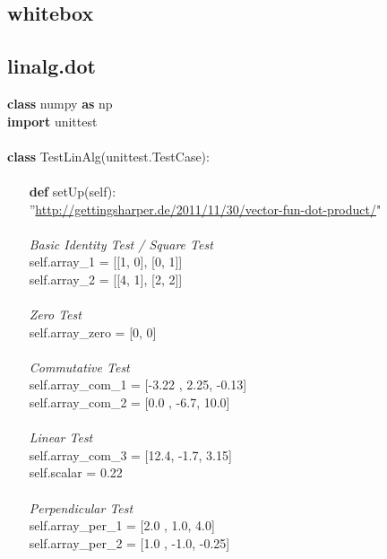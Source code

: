\documentclass[a4paper,11pt]{article}
\begin{document}
\subsection{whitebox}




\subsection{linalg.dot}
\begin{algorithm}[H]
	\textbf{class} numpy \textbf{as} np
\\	\textbf{import} unittest
\\
\\ \textbf{class} TestLinAlg(unittest.TestCase):
\\
\\$ ~~~~~~~~ $\textbf{def} setUp(self):	
\\ $ ~~~~~~~~ $''\url{http://gettingsharper.de/2011/11/30/vector-fun-dot-product/}" 
\\
\\ $ ~~~~~~~~ $\textit{Basic Identity Test / Square Test}
\\ $ ~~~~~~~~ $self.array\_1 = [[1, 0], [0, 1]]
\\ $ ~~~~~~~~ $self.array\_2 = [[4, 1], [2, 2]]
\\ $ ~~~~~~~~ $
\\ $ ~~~~~~~~ $\textit{Zero Test}
\\ $ ~~~~~~~~ $self.array\_zero = [0, 0]
\\ $ ~~~~~~~~ $
\\ $ ~~~~~~~~ $\textit{Commutative Test}
\\ $ ~~~~~~~~ $self.array\_com\_1 = [-3.22 , 2.25, -0.13]
\\ $ ~~~~~~~~ $self.array\_com\_2 = [0.0 , -6.7, 10.0]   
\\ $ ~~~~~~~~ $
\\ $ ~~~~~~~~ $\textit{Linear Test}
\\ $ ~~~~~~~~ $self.array\_com\_3 = [12.4, -1.7, 3.15]
\\ $ ~~~~~~~~ $self.scalar = 0.22
\\ $ ~~~~~~~~ $
\\ $ ~~~~~~~~ $\textit{Perpendicular Test}
\\ $ ~~~~~~~~ $self.array\_per\_1 = [2.0 , 1.0, 4.0]
\\ $ ~~~~~~~~ $self.array\_per\_2 = [1.0 , -1.0, -0.25]
\end{algorithm}
\end{document}
